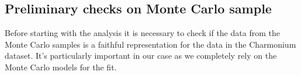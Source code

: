 \subsection{Preliminary checks on Monte Carlo sample}
\label{subsec:preliminary}

Before starting with the analysis it is necessary to check if the data from the Monte Carlo samples is a faithful representation for the data in the Charmonium dataset.
It's particularly important in our case as we completely rely on the Monte Carlo models for the fit.



